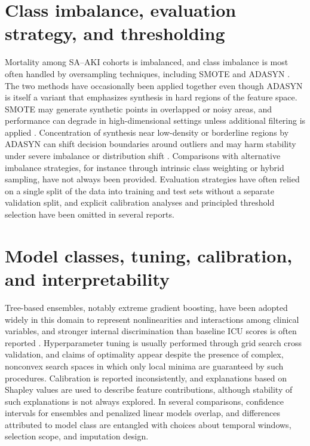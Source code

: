 \section{Class imbalance, evaluation strategy, and thresholding}
Mortality among SA--AKI cohorts is imbalanced, and class imbalance is most often handled by oversampling techniques, including SMOTE and ADASYN \citep{Chawla_2002,He_2008}. The two methods have occasionally been applied together even though ADASYN is itself a variant that emphasizes synthesis in hard regions of the feature space. SMOTE may generate synthetic points in overlapped or noisy areas, and performance can degrade in high-dimensional settings unless additional filtering is applied \citep{Blagus_2013,Saez_2015}. Concentration of synthesis near low-density or borderline regions by ADASYN can shift decision boundaries around outliers and may harm stability under severe imbalance or distribution shift \citep{Krawczyk_2016}. Comparisons with alternative imbalance strategies, for instance through intrinsic class weighting or hybrid sampling, have not always been provided. Evaluation strategies have often relied on a single split of the data into training and test sets without a separate validation split, and explicit calibration analyses and principled threshold selection have been omitted in several reports.

\section{Model classes, tuning, calibration, and interpretability}
Tree-based ensembles, notably extreme gradient boosting, have been adopted widely in this domain to represent nonlinearities and interactions among clinical variables, and stronger internal discrimination than baseline ICU scores is often reported \citep{Chen_Guestrin_2016,Luo_2022,Li_2023_SciRep,Qu_2024,Wang_2024,Chen_2025,Le_2025}. Hyperparameter tuning is usually performed through grid search cross validation, and claims of optimality appear despite the presence of complex, nonconvex search spaces in which only local minima are guaranteed by such procedures. Calibration is reported inconsistently, and explanations based on Shapley values are used to describe feature contributions, although stability of such explanations is not always explored. In several comparisons, confidence intervals for ensembles and penalized linear models overlap, and differences attributed to model class are entangled with choices about temporal windows, selection scope, and imputation design.

